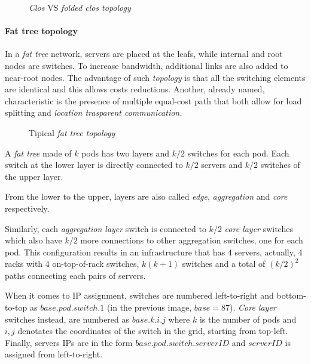 \begin{figure}[ht!]
    \centering
    \hspace{1.5cm}
    \caption{\emph{Clos} VS \emph{folded clos topology}}
\end{figure}

\paragraph{Fat tree topology}
In a \emph{fat tree} network, servers are placed at the leafs, while internal
and root nodes are switches. To increase bandwidth, additional links are also
added to near-root nodes. The advantage of such \emph{topology} is that all the
switching elements are identical and this allows costs reductions. Another,
already named, characteristic is the presence of multiple equal-cost path that
both allow for load splitting and \emph{location trasparent communication.}

\begin{figure}[h!]
    \centering
    \caption{Tipical \emph{fat tree topology}}
\end{figure}

\noindent
A \emph{fat tree} made of $k$ pods has two layers and $k/2$ switches for each
pod. Each switch at the lower layer is directly connected to $k/2$ servers
and $k/2$ switches of the upper layer.

\begin{note}
    From the lower to the upper, layers are also called \emph{edge},
    \emph{aggregation} and \emph{core} respectively.
\end{note}

\noindent
Similarly, each \emph{aggregation layer} switch is connected to $k/2$ \emph{core
layer} switches which also have $k/2$ more connections to other aggregation
switches, one for each pod. This configuration results in an infrastructure
that has $4$ servers, actually, $4$ racks with $4$ on-top-of-rack switches,
$k(k+1)$ switches and a total of $(k/2)^2$ paths connecting each pairs of
servers.

When it comes to IP assignment, switches are numbered left-to-right and
bottom-to-top as $base.pod.switch.1$ (in the previous image, $base=87$).
\emph{Core layer} switches instead, are numbered as $base.k.i.j$ where $k$ is
the number of pods and $i,j$ denotates the coordinates of the switch in the
grid, starting from top-left. Finally, servers IPs are in the form
$base.pod.switch.serverID$ and $serverID$ is assigned from left-to-right.

